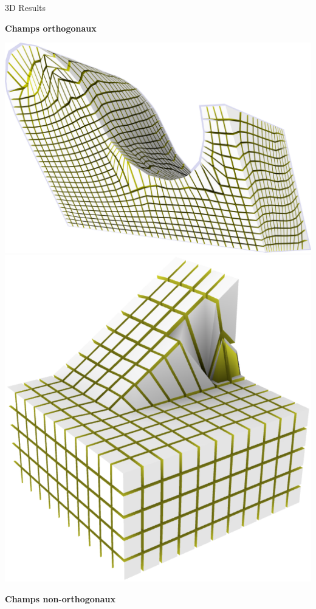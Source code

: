 \documentclass{beamer}
\begin{document}
\begin{frame}{3D Results}
    \centering
    \begin{minipage}[c]{0.45\textwidth}
    \centering 
    \textbf{Champs orthogonaux}
    \vspace*{1\baselineskip}
    
    
    \includegraphics[width=.66\linewidth]{img_spm_ff/shear_ortho.png}
    \includegraphics[width=.66\linewidth]{img_spm_ff/slope_ortho_front.png}
    \end{minipage}%
    \hfill\vline\hfill
    \begin{minipage}[c]{0.45\textwidth}
    \centering 
    \textbf{Champs non-orthogonaux}
    \vspace*{1\baselineskip}
    

\end{minipage}
\end{frame}
\end{document}
